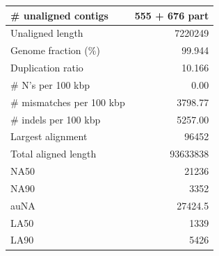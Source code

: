 \documentclass[12pt,a4paper]{article}
\begin{document}
\begin{table}[ht]
\begin{center}
\begin{tabular}{|l*{1}{|r}|}
\# unaligned contigs & 555 + 676 part \\ \hline
Unaligned length & 7220249 \\ \hline
Genome fraction (\%) & 99.944 \\ \hline
Duplication ratio & 10.166 \\ \hline
\# N's per 100 kbp & 0.00 \\ \hline
\# mismatches per 100 kbp & 3798.77 \\ \hline
\# indels per 100 kbp & 5257.00 \\ \hline
Largest alignment & 96452 \\ \hline
Total aligned length & 93633838 \\ \hline
NA50 & 21236 \\ \hline
NA90 & 3352 \\ \hline
auNA & 27424.5 \\ \hline
LA50 & 1339 \\ \hline
LA90 & 5426 \\ \hline
\end{tabular}
\end{center}
\end{table}
\end{document}
